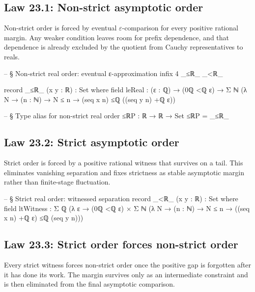 \documentclass[11pt,a4paper]{book}
\begin{document}
\subsection*{Law 23.1: Non-strict asymptotic order}

Non-strict order is forced by eventual $\varepsilon$-comparison for every positive rational margin. Any weaker condition leaves room for prefix dependence, and that dependence is already excluded by the quotient from Cauchy representatives to reals.

\begin{code}
-- § Non-strict real order: eventual ε-approximation
infix 4 _≤ℝ_ _<ℝ_

record _≤ℝ_ (x y : ℝ) : Set where
  field
    leReal : (ε : ℚ) → (0ℚ <ℚ ε) → Σ ℕ (λ N → (n : ℕ) → N ≤ n → (seq x n) ≤ℚ ((seq y n) +ℚ ε))

-- § Type alias for non-strict real order
≤ℝP : ℝ → ℝ → Set
≤ℝP = _≤ℝ_
\end{code}

\subsection*{Law 23.2: Strict asymptotic order}

Strict order is forced by a positive rational witness that survives on a tail. This eliminates vanishing separation and fixes strictness as stable asymptotic margin rather than finite-stage fluctuation.

\begin{code}
-- § Strict real order: witnessed separation
record _<ℝ_ (x y : ℝ) : Set where
  field
    ltWitness : Σ ℚ (λ ε → (0ℚ <ℚ ε) × Σ ℕ (λ N → (n : ℕ) → N ≤ n → ((seq x n) +ℚ ε) ≤ℚ (seq y n)))
\end{code}

\subsection*{Law 23.3: Strict order forces non-strict order}

Every strict witness forces non-strict order once the positive gap is forgotten after it has done its work. The margin survives only as an intermediate constraint and is then eliminated from the final asymptotic comparison.
\end{document}
